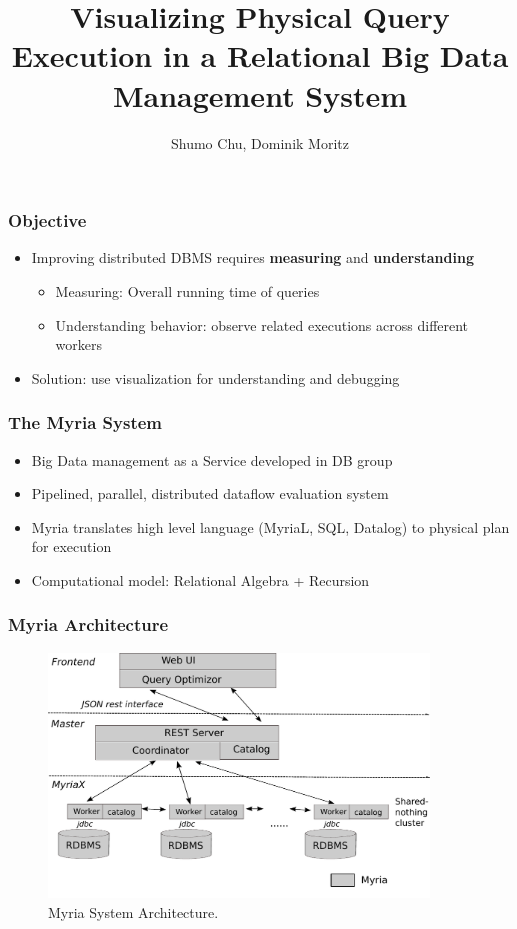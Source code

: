 \documentclass[mathserif,serif,handout]{beamer}
\title[Query Visualization] %
{Visualizing Physical Query Execution in a Relational Big Data Management System}
\subtitle{}
\author[Chu, moritz] %
{Shumo Chu, Dominik Moritz}
\begin{document}
\begin{frame}
\titlepage

\end{frame}

\begin{frame}
  \frametitle{Objective}
  \begin{itemize}
  	\item Improving distributed DBMS requires \textbf{measuring} and \textbf{understanding}
    \begin{itemize}
      \item Measuring: Overall running time of queries
      \item Understanding behavior: observe related executions across different workers
    \end{itemize}
    \item Solution: use visualization for understanding and debugging
  \end{itemize}
\end{frame}

\begin{frame}
  \frametitle{The Myria System}
  \begin{itemize}
  	\item Big Data management as a Service developed in DB group
  	\item Pipelined, parallel, distributed dataflow evaluation system
  	\item Myria translates high level  language (MyriaL, SQL, Datalog) 
  	to physical plan for execution
  	\item Computational model: Relational Algebra + Recursion
  \end{itemize}
\end{frame}

\begin{frame}
  \frametitle{Myria Architecture}
  \begin{figure}
   \begin{center}
       \includegraphics[width=0.9\textwidth]{myria_arch.pdf}
     \end{center}
    \caption{Myria System Architecture.}
    \label{fig:myria_arc}
  \end{figure}
\end{frame}
\end{document}

